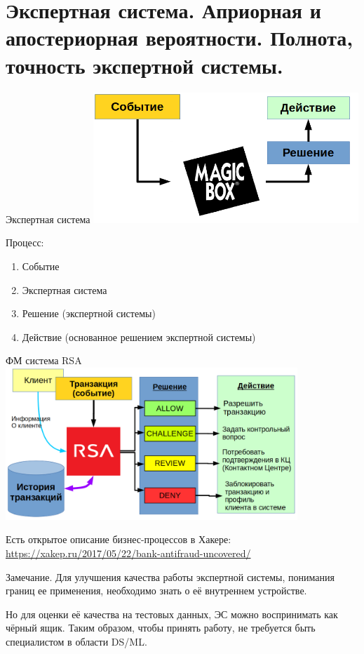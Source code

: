 \documentclass{beamer}
\begin{document}
  \section{Экспертная система. Априорная и апостериорная вероятности. Полнота, точность экспертной системы.}\label{section:expert_systems_recall_presision}
  
  \begin{frame}{Экспертная система}
   \includegraphics[width=10cm]{../pic/expert_system_1.png}
  
  Процесс:
  \begin{enumerate}
  	\item Событие
  	\item Экспертная система
  	\item Решение (экспертной системы)
  	\item Действие (основанное решением экспертной системы)
  \end{enumerate}
  \end{frame}

  \begin{frame}{ФМ система RSA}
   \includegraphics[width=11cm]{../pic/expert_system_rsa.png}
  
  Есть открытое описание бизнес-процессов в Хакере:
  \url{https://xakep.ru/2017/05/22/bank-antifraud-uncovered/}
  \end{frame}
  
  \begin{frame}
  	\begin{block}{Замечание.}
  		Для улучшения качества работы экспертной системы, понимания границ ее применения,
  		необходимо знать о её внутреннем устройстве.
  		
  		Но для оценки её качества на тестовых данных, ЭС можно воспринимать как чёрный ящик.
  		Таким образом, чтобы принять работу, не требуется быть специалистом в области DS/ML.
  	\end{block}
  \end{frame}
\end{document}
